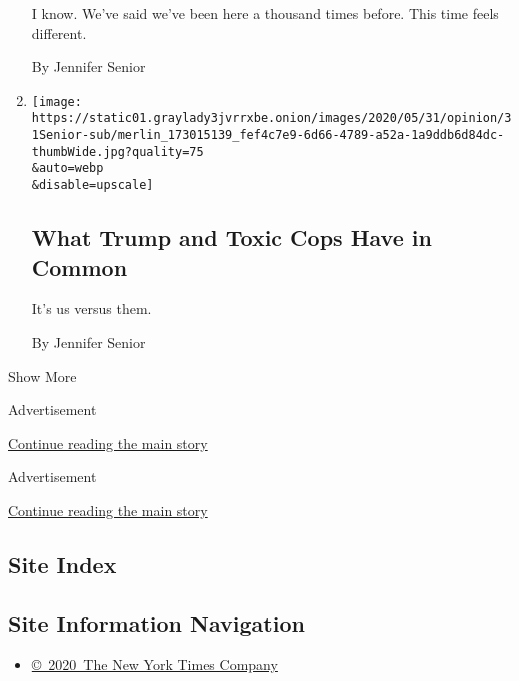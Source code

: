 \begin{enumerate}
  I know. We've said we've been here a thousand times before. This time
  feels different.

  By Jennifer Senior
\item
  \href{/2020/05/31/opinion/trump-police-george-floyd.html}{}

  \texttt{[image: https://static01.graylady3jvrrxbe.onion/images/2020/05/31/opinion/31Senior-sub/merlin\_173015139\_fef4c7e9-6d66-4789-a52a-1a9ddb6d84dc-thumbWide.jpg?quality=75\\\&auto=webp\\\&disable=upscale]}

  \hypertarget{what-trump-and-toxic-cops-have-in-common}{%
  \subsection{What Trump and Toxic Cops Have in
  Common}\label{what-trump-and-toxic-cops-have-in-common}}

  It's us versus them.

  By Jennifer Senior
\end{enumerate}

Show More

Advertisement

\protect\hyperlink{after-mid1}{Continue reading the main story}

Advertisement

\protect\hyperlink{after-mktg}{Continue reading the main story}

\hypertarget{site-index}{%
\subsection{Site Index}\label{site-index}}

\hypertarget{site-information-navigation}{%
\subsection{Site Information
Navigation}\label{site-information-navigation}}

\begin{itemize}
\tightlist
\item
  \href{https://help.nytimes3xbfgragh.onion/hc/en-us/articles/115014792127-Copyright-notice}{©~2020~The
  New York Times Company}
\end{itemize}

